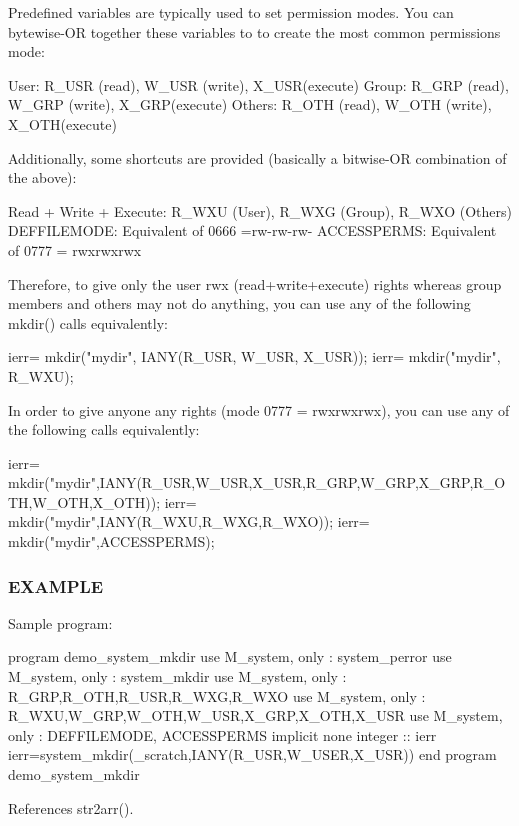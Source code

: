 \begin{DoxyVerb}Predefined variables are typically used to set permission modes.
You can bytewise-OR together these variables to to create the most common
permissions mode:

 User:    R_USR  (read),  W_USR  (write),  X_USR(execute)
 Group:   R_GRP  (read),  W_GRP  (write),  X_GRP(execute)
 Others:  R_OTH  (read),  W_OTH  (write),  X_OTH(execute)

Additionally, some shortcuts are provided (basically a bitwise-OR combination of the above):

  Read + Write + Execute: R_WXU (User), R_WXG (Group), R_WXO (Others)
  DEFFILEMODE: Equivalent of 0666 =rw-rw-rw-
  ACCESSPERMS: Equivalent of 0777 = rwxrwxrwx

Therefore, to give only the user rwx (read+write+execute) rights whereas
group members and others may not do anything, you can use any of the
following mkdir() calls equivalently:

  ierr= mkdir("mydir", IANY(R_USR, W_USR, X_USR));
  ierr= mkdir("mydir", R_WXU);

In order to give anyone any rights (mode 0777 = rwxrwxrwx), you can
use any of the following calls equivalently:

  ierr= mkdir("mydir",IANY(R_USR,W_USR,X_USR,R_GRP,W_GRP,X_GRP,R_OTH,W_OTH,X_OTH));
  ierr= mkdir("mydir",IANY(R_WXU,R_WXG,R_WXO));
  ierr= mkdir("mydir",ACCESSPERMS);
\end{DoxyVerb}


\subsubsection*{E\+X\+A\+M\+P\+LE}

Sample program\+:

program demo\+\_\+system\+\_\+mkdir use M\+\_\+system, only \+: system\+\_\+perror use M\+\_\+system, only \+: system\+\_\+mkdir use M\+\_\+system, only \+: R\+\_\+\+G\+RP,R\+\_\+\+O\+TH,R\+\_\+\+U\+SR,R\+\_\+\+W\+XG,R\+\_\+\+W\+XO use M\+\_\+system, only \+: R\+\_\+\+W\+XU,W\+\_\+\+G\+RP,W\+\_\+\+O\+TH,W\+\_\+\+U\+SR,X\+\_\+\+G\+RP,X\+\_\+\+O\+TH,X\+\_\+\+U\+SR use M\+\_\+system, only \+: D\+E\+F\+F\+I\+L\+E\+M\+O\+DE, A\+C\+C\+E\+S\+S\+P\+E\+R\+MS implicit none integer \+:\+: ierr ierr=system\+\_\+mkdir(\textquotesingle{}\+\_\+scratch\textquotesingle{},I\+A\+N\+Y(\+R\+\_\+\+U\+S\+R,\+W\+\_\+\+U\+S\+E\+R,\+X\+\_\+\+U\+S\+R)) end program demo\+\_\+system\+\_\+mkdir 

References str2arr().

